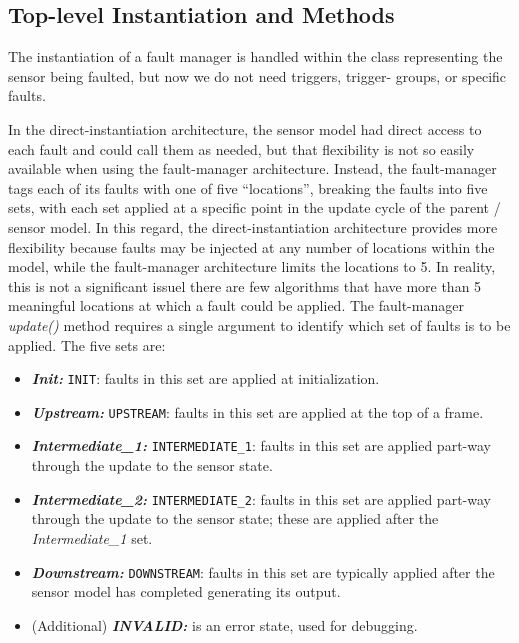 \documentclass[11pt,fleqn]{report}
\begin{document}
\subsection{Top-level Instantiation and Methods}
\par The instantiation of a fault manager is handled within the class
representing the sensor being faulted, but now we do not need triggers, trigger-
groups, or specific faults.
\begin{codeC}
#include "cml/models/utilities/fault_management/include/FaultManager.hh"

class Sensor {
 public:
  ...
  FaultManager faults;
\end{codeC}

In the direct-instantiation architecture,
the sensor model had direct access to each fault and could call them as needed,
but that flexibility is not so easily available when using
the fault-manager architecture. Instead, the fault-manager tags each of its
faults with one of five ``locations'', breaking the faults into five sets, with
each set applied at a specific point in the update cycle of the parent / sensor
model. In this regard, the direct-instantiation architecture provides more
flexibility because faults may be injected at any number of locations within
the model, while the fault-manager architecture limits the locations to 5.
In reality, this is not a significant issuel there are few algorithms that
have more than 5 meaningful locations at which a fault could be applied.
The fault-manager \textit{update()}
method requires a single argument to identify which set of faults is to be
applied. The five sets are:
\begin{itemize}
 \item \textit{\textbf{Init:}} \verb'INIT': faults in this set are applied at
   initialization.
 \item \textit{\textbf{Upstream:}} \verb'UPSTREAM': faults in this set are
   applied at the top of a frame.
 \item \textit{\textbf{Intermediate\_1:}} \verb'INTERMEDIATE_1': faults in this
   set are applied part-way through the update to the sensor state.
 \item \textit{\textbf{Intermediate\_2:}} \verb'INTERMEDIATE_2': faults in this
   set are applied part-way through the update to the sensor state; these are
   applied after the \textit{Intermediate\_1} set.
 \item \textit{\textbf{Downstream:}} \verb'DOWNSTREAM': faults in this set are
   typically applied after the sensor model has completed generating its output.
 \item (Additional) \textit{\textbf{INVALID:}} is an error state, used for
   debugging.
\end{itemize}
\end{document}
